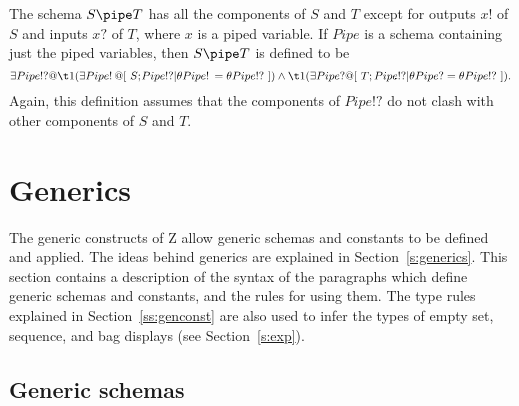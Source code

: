 \begin{manpage}
The schema $S \pipe T$ has all the components of $S$ and $T$ except
for outputs $x!$ of $S$ and inputs $x?$ of $T$, where $x$ is a piped
variable.  If $Pipe$ is a schema containing just the piped variables,
then $S \pipe T$ is defined to be
\[
        \exists Pipe!? @ \\
\t1         (\exists Pipe\rlap{!}\phantom{?} @
                [~\rlap{$S;$}\phantom{T;} Pipe!? |
			\theta Pipe\rlap{!}\phantom{?}
				= \theta Pipe!?~]) \land \\
\t1         (\exists Pipe? @
                [~T; Pipe!? | \theta Pipe? = \theta Pipe!?~]).
\]
Again, this definition assumes that the
components of $Pipe!?$ do not clash with other components of $S$
and $T$.
\end{manpage}
\section{Generics}\label{s:gendefs}

The generic constructs of Z allow generic
schemas and constants to be defined and applied. The ideas behind
generics are explained in Section~\ref{s:generics}. This section
contains a description of the syntax of the paragraphs which define
generic schemas and constants, and the rules for using them. The
type rules explained in Section~\ref{ss:genconst} are also used to
infer the types of empty set, sequence, and bag displays (see
Section~\ref{s:exp}).

\subsection{Generic schemas}\label{ss:genschema}


